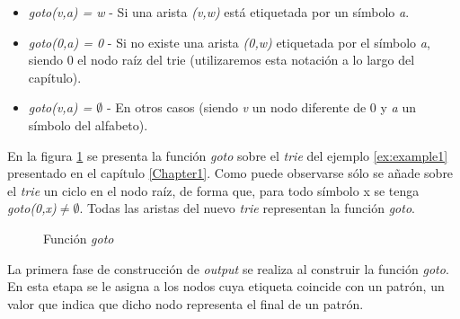 \begin{itemize}
\item {\it goto(v,a) = w} - Si una arista {\it (v,w)} está etiquetada por un símbolo {\it a}.
\item {\it goto(0,a) = 0} - Si no existe una arista {\it (0,w)} etiquetada por el símbolo {\it a}, siendo 0 el nodo raíz del trie (utilizaremos esta notación a lo largo del capítulo).
\item {\it goto(v,a) = $\emptyset$} - En otros casos  (siendo {\it v} un nodo diferente de 0 y {\it a} un símbolo del alfabeto).
\end{itemize}
\begin{example*}
En la figura \ref{fig:goto_function} se presenta la función {\it goto} sobre el \emph{trie} del ejemplo \ref{ex:example1} presentado en el capítulo \ref{Chapter1}. Como puede observarse sólo se añade sobre el \emph{trie} un ciclo en el nodo raíz, de forma que, para todo símbolo x se tenga {\it goto(0,x)$\not= \emptyset$}. Todas las aristas del nuevo \emph{trie} representan la función {\it goto}.
\begin{figure}[H]
\centering
{}
\caption[Ejemplo: Función goto]{Función {\it goto}}
	\label{fig:goto_function}
\end{figure}
\end{example*}
\myrule{}{}
La primera fase de construcción de {\it output} se realiza al construir la función {\it goto}. En esta etapa se le asigna a los nodos cuya etiqueta coincide con un patrón, un valor que indica que dicho nodo representa el final de un patrón. 
